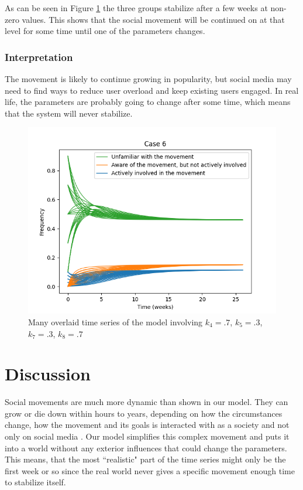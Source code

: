 \documentclass{article}
\begin{document}
    As can be seen in Figure \ref{fig:case6} the three groups stabilize after a few weeks at non-zero values. This shows that the social movement will be continued on at that level for some time until one of the parameters changes.
    \subsubsection*{Interpretation}
    The movement is likely to continue growing in popularity, but social media may need to find ways to reduce user overload and keep existing users engaged. In real life, the parameters are probably going to change after some time, which means that the system will never stabilize.

    \begin{figure}[H]

        \centering
        \includegraphics[width=\textwidth]{simulation/plots/case6.png}   
        \caption{Many overlaid time series of the model involving \mbox{$k_4=.7$}, \mbox{$k_5=.3$}, \mbox{$k_7=.3$}, \mbox{$k_8=.7$}}
        \label{fig:case6}
    \end{figure}

    \section{Discussion}
    

    Social movements are much more dynamic than shown in our model. They can grow or die down within hours to years, depending on how the circumstances change, how the movement and its goals is interacted with as a society and not only on social media \cite{hiller_reconceptualization_1975}. Our model simplifies this complex movement and puts it into a world without any exterior influences that could change the parameters. This means, that the most ``realistic" part of the time series might only be the first week or so since the real world never gives a specific movement enough time to stabilize itself.
\end{document}
